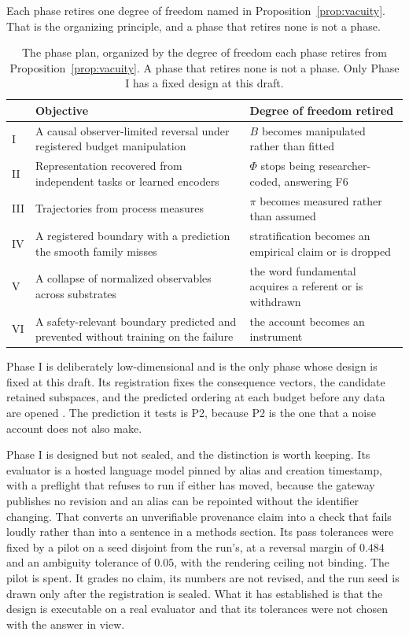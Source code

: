\documentclass[11pt,letterpaper]{article}
\theoremstyle{plain}
\theoremstyle{definition}
\begin{document}
Each phase retires one degree of freedom named in
Proposition~\ref{prop:vacuity}. That is the organizing principle, and a phase
that retires none is not a phase.

\begin{table}[!ht]
\caption{The phase plan, organized by the degree of freedom each phase retires
from Proposition~\ref{prop:vacuity}. A phase that retires none is not a phase.
Only Phase I has a fixed design at this draft.}
\label{tab:phases}
\centering\footnotesize
\begin{tabular}{@{}p{} p{} p{}@{}}
\toprule
& \textbf{Objective} & \textbf{Degree of freedom retired} \\
\midrule
I & A causal observer-limited reversal under registered budget manipulation & $B$ becomes manipulated rather than fitted \\
II & Representation recovered from independent tasks or learned encoders & $\Phi$ stops being researcher-coded, answering F6 \\
III & Trajectories from process measures & $\pi$ becomes measured rather than assumed \\
IV & A registered boundary with a prediction the smooth family misses & stratification becomes an empirical claim or is dropped \\
V & A collapse of normalized observables across substrates & the word fundamental acquires a referent or is withdrawn \\
VI & A safety-relevant boundary predicted and prevented without training on the failure & the account becomes an instrument \\
\bottomrule
\end{tabular}
\end{table}

Phase I is deliberately low-dimensional and is the only phase whose design is
fixed at this draft. Its registration fixes the consequence vectors, the
candidate retained subspaces, and the predicted ordering at each budget before
any data are opened \cite{c1}. The prediction it tests is P2, because P2 is the
one that a noise account does not also make.

Phase I is designed but not sealed, and the distinction is worth keeping. Its
evaluator is a hosted language model pinned by alias and creation timestamp,
with a preflight that refuses to run if either has moved, because the gateway
publishes no revision and an alias can be repointed without the identifier
changing. That converts an unverifiable provenance claim into a check that fails
loudly rather than into a sentence in a methods section. Its pass tolerances
were fixed by a pilot on a seed disjoint from the run's, at a reversal margin of
$0.484$ and an ambiguity tolerance of $0.05$, with the rendering ceiling not
binding. The pilot is spent. It grades no claim, its numbers are not revised,
and the run seed is drawn only after the registration is sealed. What it has
established is that the design is executable on a real evaluator and that its
tolerances were not chosen with the answer in view.
\end{document}
